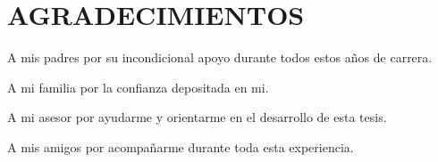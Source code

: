 \chapter*{AGRADECIMIENTOS}

\null{}
    \begin{flushright}
            A mis padres por su incondicional apoyo durante todos estos años de carrera.
            
            A mi familia por la confianza depositada en mi.
            
            A mi asesor por ayudarme y orientarme en el desarrollo de esta tesis.
            
            A mis amigos por acompañarme durante toda esta experiencia.
    \end{flushright}
\null

\clearpage